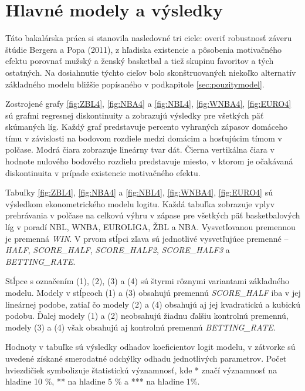 \documentclass[
  digital, %
  twoside, %
  notable,   %
  lof,     %
  lot,     %
]{fithesis3}
\begin{document}
	\chapter{Hlavné modely a výsledky}
	Táto bakalárska práca si stanovila nasledovné tri ciele: overiť robustnosť záveru štúdie Bergera a Popa (2011), z hľadiska existencie a pôsobenia motivačného efektu porovnať mužský a ženský basketbal a tiež skupinu favoritov a tých ostatných. Na dosiahnutie týchto cieľov bolo skonštruovaných niekoľko alternatív základného modelu bližšie popísaného v podkapitole \ref{sec:pouzitymodel}.
	
	Zostrojené grafy \ref{fig:ZBL4}, \ref{fig:NBA4} a \ref{fig:NBL4}, \ref{fig:WNBA4}, \ref{fig:EURO4} sú grafmi regresnej diskontinuity a zobrazujú výsledky pre všetkých päť skúmaných líg. Každý graf predstavuje percento vyhraných zápasov domáceho tímu v závislosti na bodovom rozdiele medzi domácim a hosťujúcim tímom v polčase. Modrá čiara zobrazuje lineárny tvar dát. Čierna vertikálna čiara v hodnote nulového bodového rozdielu predstavuje miesto, v ktorom je očakávaná diskontinuita v prípade existencie motivačného efektu.

	Tabuľky \ref{fig:ZBL4}, \ref{fig:NBA4} a \ref{fig:NBL4}, \ref{fig:WNBA4}, \ref{fig:EURO4} sú výsledkom ekonometrického modelu logitu. Každá tabuľka zobrazuje vplyv prehrávania v polčase na celkovú výhru v zápase pre všetkých päť basketbalových líg v poradí NBL, WNBA, EUROLIGA, ŽBL a NBA. Vysvetľovanou premennou je premenná \textit{WIN}. V prvom stĺpci zľava sú jednotlivé vysvetľujúce premenné – \textit{HALF}, \textit{SCORE\_HALF}, \textit{SCORE\_HALF2}, \textit{SCORE\_HALF3} a \textit{BETTING\_RATE}. 

	Stĺpce s označením (1), (2), (3) a (4) sú štyrmi rôznymi variantami základného modelu. Modely v stĺpcoch (1) a (3) obsahujú premennú \textit{SCORE\_HALF} iba v jej lineárnej podobe, zatiaľ čo modely (2) a (4) obsahujú aj jej kvadratickú a kubickú podobu. Ďalej modely (1) a (2) neobsahujú žiadnu ďalšiu kontrolnú premennú, modely (3) a (4) však obsahujú aj kontrolnú premennú \textit{BETTING\_RATE}. 
	
	Hodnoty v tabuľke sú výsledky odhadov koeficientov logit modelu, v zátvorke sú uvedené získané smerodatné odchýlky odhadu jednotlivých parametrov. Počet hviezdičiek symbolizuje štatistickú významnosť, kde * značí významnosť na hladine 10 \%, ** na hladine 5 \% a *** na hladine 1\%.
\end{document}
